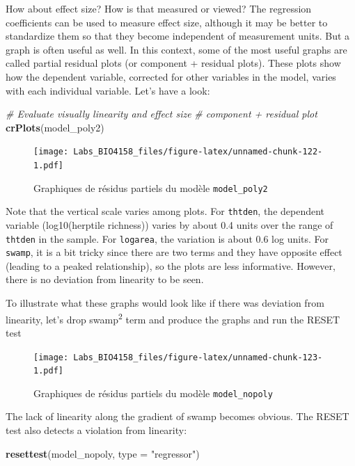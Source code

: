 \documentclass[
  12pt,
]{book}
\newenvironment{Shaded}{\begin{snugshade}}{\end{snugshade}}
\newcommand{\CommentTok}[1]{\textcolor[rgb]{0.56,0.35,0.01}{\textit{#1}}}
\newcommand{\DataTypeTok}[1]{\textcolor[rgb]{0.13,0.29,0.53}{#1}}
\newcommand{\KeywordTok}[1]{\textcolor[rgb]{0.13,0.29,0.53}{\textbf{#1}}}
\newcommand{\NormalTok}[1]{#1}
\newcommand{\StringTok}[1]{\textcolor[rgb]{0.31,0.60,0.02}{#1}}
\begin{document}
How about effect size? How is that measured or viewed? The regression coefficients can be used to measure effect size, although it may be better to standardize them so that they become independent of measurement units. But a graph is often useful as well. In this context, some of the most useful graphs are called partial residual plots (or component + residual plots). These plots show how the dependent variable, corrected for other variables in the model, varies with each individual variable. Let's have a look:

\begin{Shaded}
\begin{Highlighting}[]
\CommentTok{\# Evaluate visually linearity and effect size}
\CommentTok{\# component + residual plot}
\KeywordTok{crPlots}\NormalTok{(model\_poly2)}
\end{Highlighting}
\end{Shaded}

\begin{figure}
\centering
\texttt{[image: Labs\_BIO4158\_files/figure-latex/unnamed-chunk-122-1.pdf]}
\caption{\label{fig:unnamed-chunk-122}Graphiques de résidus partiels du modèle \texttt{model\_poly2}}
\end{figure}

Note that the vertical scale varies among plots. For \texttt{thtden}, the dependent variable (log10(herptile richness)) varies by about 0.4 units over the range of \texttt{thtden} in the sample. For \texttt{logarea}, the variation is about 0.6 log units. For \texttt{swamp}, it is a bit tricky since there are two terms and they have opposite effect (leading to a peaked relationship), so the plots are less informative. However, there is no deviation from linearity to be seen.

To illustrate what these graphs would look like if there was deviation from linearity, let's drop swamp\textsuperscript{2} term and produce the graphs and run the RESET test

\begin{figure}
\centering
\texttt{[image: Labs\_BIO4158\_files/figure-latex/unnamed-chunk-123-1.pdf]}
\caption{\label{fig:unnamed-chunk-123}Graphiques de résidus partiels du modèle \texttt{model\_nopoly}}
\end{figure}

The lack of linearity along the gradient of swamp becomes obvious.
The RESET test also detects a violation from linearity:

\begin{Shaded}
\begin{Highlighting}[]
\KeywordTok{resettest}\NormalTok{(model\_nopoly, }\DataTypeTok{type =} \StringTok{"regressor"}\NormalTok{)}
\end{Highlighting}
\end{Shaded}
\end{document}

